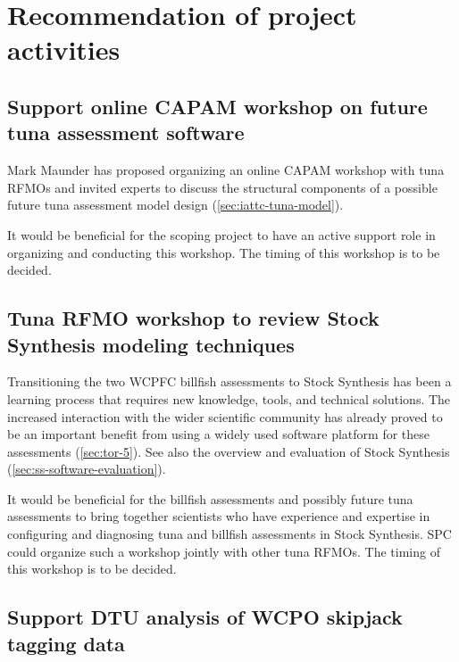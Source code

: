 \documentclass{SCreport}
\begin{document}
\vspace{2ex}

\section{Recommendation of project activities}

\subsection{Support online CAPAM workshop on future tuna assessment software}
\label{sec:capam-online-workshop}

Mark Maunder has proposed organizing an online CAPAM workshop with tuna RFMOs
and invited experts to discuss the structural components of a possible future
tuna assessment model design (\autoref{sec:iattc-tuna-model}).

It would be beneficial for the scoping project to have an active support role in
organizing and conducting this workshop. The timing of this workshop is to be
decided.

\vspace{2ex}

\subsection{Tuna RFMO workshop to review Stock Synthesis modeling techniques}
\label{sec:ss-modeling-techniques}

Transitioning the two WCPFC billfish assessments to Stock Synthesis has been a
learning process that requires new knowledge, tools, and technical solutions.
The increased interaction with the wider scientific community has already proved
to be an important benefit from using a widely used software platform for these
assessments (\autoref{sec:tor-5}). See also the overview and evaluation of Stock
Synthesis (\autoref{sec:ss-software-evaluation}).

It would be beneficial for the billfish assessments and possibly future tuna
assessments to bring together scientists who have experience and expertise in
configuring and diagnosing tuna and billfish assessments in Stock Synthesis. SPC
could organize such a workshop jointly with other tuna RFMOs. The timing of this
workshop is to be decided.

\vspace{2ex}

\subsection{Support DTU analysis of WCPO skipjack tagging data}
\label{sec:dtu-support-tagging}
\end{document}
